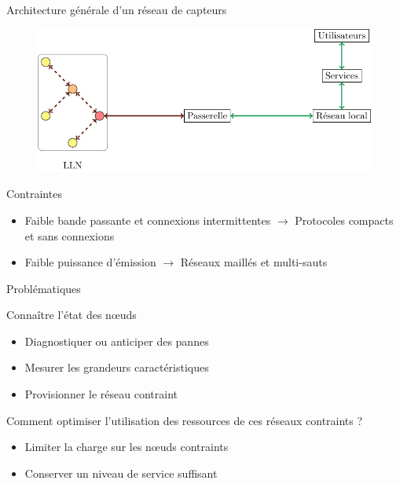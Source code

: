 \begin{frame}{Architecture générale d'un réseau de capteurs}
  \begin{figure}
    \centering
    \includegraphics[scale=.75]{figures/schema_passerelle_slides.pdf}
  \end{figure}
  \begin{block}{Contraintes}
    \begin{itemize}
      \item Faible bande passante et connexions intermittentes $\to$ Protocoles compacts et sans connexions
      \item Faible puissance d'émission $\to$ Réseaux maillés et multi-sauts
    \end{itemize}
  \end{block}


\end{frame}

\begin{frame}{Problématiques}
  \begin{block}{Connaître l'état des nœuds}
    \begin{itemize}
      \item Diagnostiquer ou anticiper des pannes
      \item Mesurer les grandeurs caractéristiques
      \item Provisionner le réseau contraint
    \end{itemize}
  \end{block}

  \begin{block}{Comment optimiser l'utilisation des ressources de ces réseaux contraints ?}
    \begin{itemize}
      \item Limiter la charge sur les nœuds contraints
      \item Conserver un niveau de service suffisant
    \end{itemize}
  \end{block}

\end{frame}

